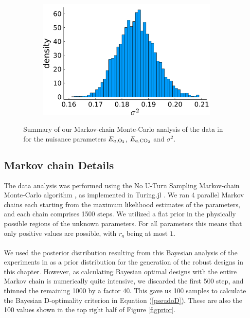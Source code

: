 \begin{figure}[H]
\begin{subfigure}[b]{0.3\textwidth}
	\end{subfigure}
	\begin{subfigure}[b]{0.3\textwidth}
		\centering
		\includegraphics[width=1.0\textwidth]{figure/paper 2/nuisance3.pdf}
	\end{subfigure}
	\caption{Summary of our Markov-chain Monte-Carlo analysis of the data in \textcite{ho} for the nuisance parameters $E_{a,\text{O}_2}$, $E_{a,\text{CO}_2}$ and $\sigma^2$.}
	\label{fignuisance}
\end{figure}
\subsection{Markov chain Details}
\label{sec_markov}
The data analysis was performed using the No U-Turn Sampling Markov-chain Monte-Carlo algorithm \parencite{hoffman}, as implemented in Turing.jl \parencite{ge}. We ran 4 parallel Markov chains each starting from the maximum likelihood estimates of the parameters, and each chain comprises 1500 steps. We utilized a flat prior in the physically possible regions of the unknown parameters. For all parameters this means that only positive values are possible, with $r_q$ being at most $1$.
\\
\\
We used the posterior distribution resulting from this Bayesian analysis of the experiments in \textcite{ho} as a prior distribution for the generation of the robust designs in this chapter. However, as calculating Bayesian optimal designs with the entire Markov chain is numerically quite intensive, we discarded the first 500 step, and thinned the remaining 1000 by a factor 40. This gave us 100 samples to calculate the Bayesian D-optimality criterion in Equation (\ref{pseudoD}). These are also the 100 values shown in the top right half of Figure \ref{figprior}.

